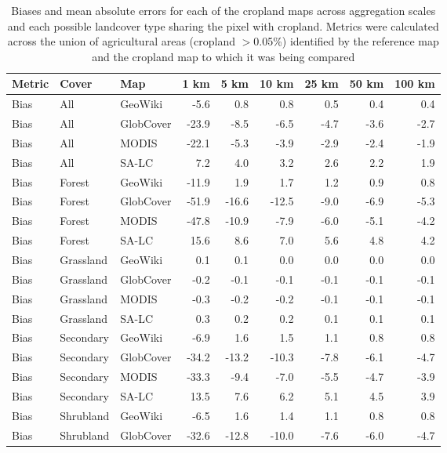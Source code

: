 \begin{longtable}{lllrrrrrr}
\caption{Biases and mean absolute errors for each of the cropland maps across aggregation scales and each possible landcover type sharing the pixel with cropland. Metrics were calculated across the union of agricultural areas (cropland $>$0.05\%) identified by the reference map and the cropland map to which it was being compared} \\ 
  \hline
Metric & Cover & Map & 1 km & 5 km & 10 km & 25 km & 50 km & 100 km \\ 
  \hline
Bias & All & GeoWiki & -5.6 & 0.8 & 0.8 & 0.5 & 0.4 & 0.4 \\ 
  Bias & All & GlobCover & -23.9 & -8.5 & -6.5 & -4.7 & -3.6 & -2.7 \\ 
  Bias & All & MODIS & -22.1 & -5.3 & -3.9 & -2.9 & -2.4 & -1.9 \\ 
  Bias & All & SA-LC & 7.2 & 4.0 & 3.2 & 2.6 & 2.2 & 1.9 \\ 
  Bias & Forest & GeoWiki & -11.9 & 1.9 & 1.7 & 1.2 & 0.9 & 0.8 \\ 
  Bias & Forest & GlobCover & -51.9 & -16.6 & -12.5 & -9.0 & -6.9 & -5.3 \\ 
  Bias & Forest & MODIS & -47.8 & -10.9 & -7.9 & -6.0 & -5.1 & -4.2 \\ 
  Bias & Forest & SA-LC & 15.6 & 8.6 & 7.0 & 5.6 & 4.8 & 4.2 \\ 
  Bias & Grassland & GeoWiki & 0.1 & 0.1 & 0.0 & 0.0 & 0.0 & 0.0 \\ 
  Bias & Grassland & GlobCover & -0.2 & -0.1 & -0.1 & -0.1 & -0.1 & -0.1 \\ 
  Bias & Grassland & MODIS & -0.3 & -0.2 & -0.2 & -0.1 & -0.1 & -0.1 \\ 
  Bias & Grassland & SA-LC & 0.3 & 0.2 & 0.2 & 0.1 & 0.1 & 0.1 \\ 
  Bias & Secondary & GeoWiki & -6.9 & 1.6 & 1.5 & 1.1 & 0.8 & 0.8 \\ 
  Bias & Secondary & GlobCover & -34.2 & -13.2 & -10.3 & -7.8 & -6.1 & -4.7 \\ 
  Bias & Secondary & MODIS & -33.3 & -9.4 & -7.0 & -5.5 & -4.7 & -3.9 \\ 
  Bias & Secondary & SA-LC & 13.5 & 7.6 & 6.2 & 5.1 & 4.5 & 3.9 \\ 
  Bias & Shrubland & GeoWiki & -6.5 & 1.6 & 1.4 & 1.1 & 0.8 & 0.8 \\ 
  Bias & Shrubland & GlobCover & -32.6 & -12.8 & -10.0 & -7.6 & -6.0 & -4.7 \\ 

\end{longtable}
